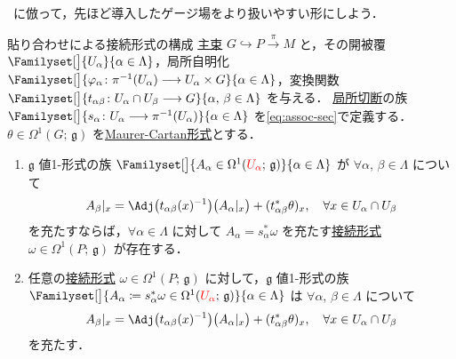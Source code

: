 \documentclass[geometry_main]{subfiles}
\begin{document}
~\cite[第10章-1]{Nakahara2018topo2}に倣って，先ほど導入したゲージ場をより扱いやすい形にしよう．

\begin{mytheo}[label=thm:local-connection]{貼り合わせによる接続形式の構成}
    \hyperref[def.PFD]{主束} $G \hookrightarrow P \xrightarrow{\pi} M$ と，その開被覆 $\Familyset[\big]{U_\alpha}{\alpha \in \Lambda}$，局所自明化 $\Familyset[\big]{\varphi_\alpha \colon \pi^{-1}(U_\alpha) \lto U_\alpha \times G}{\alpha \in \Lambda}$，変換関数 $\Familyset[\big]{t_{\alpha\beta} \colon U_\alpha \cap U_\beta \lto G}{\alpha,\, \beta \in \Lambda}$ を与える．
    \hyperref[def.section]{局所切断}の族 $\Familyset[\big]{s_\alpha \colon U_\alpha \lto \pi^{-1}(U_\alpha)}{\alpha \in \Lambda}$ を\eqref{eq:assoc-sec}で定義する． 
    $\theta \in \Omega^1(G;\, \mathfrak{g})$ を\hyperref[def:Maurer-Cartan]{Maurer-Cartan形式}とする．
    \begin{enumerate}
        \item $\mathfrak{g}$ 値1-形式の族 $\Familyset[\big]{A_\alpha \in \Omega^1(\textcolor{red}{U_\alpha};\, \mathfrak{g})}{\alpha \in \Lambda}$ が $\forall \alpha,\, \beta \in \Lambda$ について
        \begin{align}
            \label{eq:compatible}
            A_\beta|_x = \Adj \bigl( t_{\alpha\beta}(x)^{-1} \bigr) \bigl( A_\alpha|_x \bigr) + (t_{\alpha\beta}^* \theta)_x, \quad \forall x \in U_\alpha \cap U_\beta
        \end{align}
        を充たすならば，$\forall \alpha \in \Lambda$ に対して $A_\alpha = s_\alpha^* \omega$ を充たす\hyperref[def:connection]{接続形式} $\omega \in \Omega^1(P;\, \mathfrak{g})$ が存在する．
        \item 任意の\hyperref[def:connection]{接続形式} $\omega \in \Omega^1(P;\, \mathfrak{g})$ に対して，$\mathfrak{g}$ 値1-形式の族 $\Familyset[\big]{A_\alpha \coloneqq s_\alpha^* \omega \in \Omega^1 (\textcolor{red}{U_\alpha};\, \mathfrak{g})}{\alpha \in \Lambda}$ は $\forall \alpha,\, \beta \in \Lambda$ について
        \begin{align}
            A_\beta|_x = \Adj \bigl( t_{\alpha\beta}(x)^{-1} \bigr) \bigl( A_\alpha|_x \bigr) + (t_{\alpha\beta}^* \theta)_x, \quad \forall x \in U_\alpha \cap U_\beta
        \end{align}
        を充たす．
    \end{enumerate}
\end{mytheo}
\end{document}
